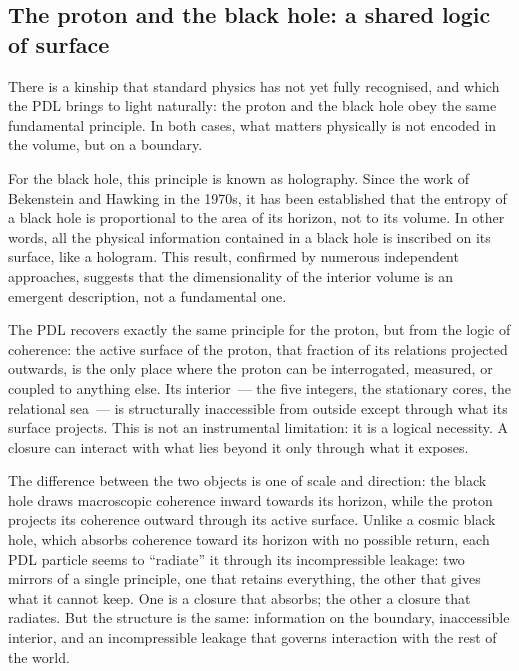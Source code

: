 \documentclass[12pt, a4paper, openright]{book}
\begin{document}
\subsection*{The proton and the black hole: a shared logic of surface}

There is a kinship that standard physics has not yet fully recognised, and which the PDL brings to light naturally: the proton and the black hole obey the same fundamental principle. In both cases, what matters physically is not encoded in the volume, but on a boundary.

\medskip

For the black hole, this principle is known as holography. Since the work of Bekenstein and Hawking in the 1970s, it has been established that the entropy of a black hole is proportional to the area of its horizon, not to its volume. In other words, all the physical information contained in a black hole is inscribed on its surface, like a hologram. This result, confirmed by numerous independent approaches, suggests that the dimensionality of the interior volume is an emergent description, not a fundamental one.

\medskip

The PDL recovers exactly the same principle for the proton, but from the logic of coherence: the active surface of the proton, that fraction of its relations projected outwards, is the only place where the proton can be interrogated, measured, or coupled to anything else. Its interior~--- the five integers, the stationary cores, the relational sea~--- is structurally inaccessible from outside except through what its surface projects. This is not an instrumental limitation: it is a logical necessity. A closure can interact with what lies beyond it only through what it exposes.

\medskip

The difference between the two objects is one of scale and direction: the black hole draws macroscopic coherence inward towards its horizon, while the proton projects its coherence outward through its active surface. Unlike a cosmic black hole, which absorbs coherence toward its horizon with no possible return, each PDL particle seems to ``radiate'' it through its incompressible leakage: two mirrors of a single principle, one that retains everything, the other that gives what it cannot keep. One is a closure that absorbs; the other a closure that radiates. But the structure is the same: information on the boundary, inaccessible interior, and an incompressible leakage that governs interaction with the rest of the world.
\end{document}
